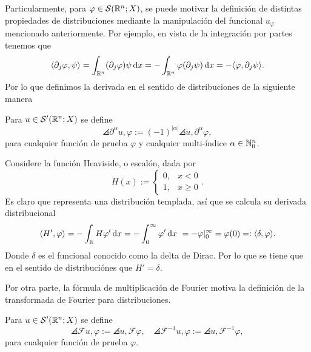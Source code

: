 Particularmente, para $\varphi\in\mathcal{S}(\mathbb{R}^n;X)$, se puede motivar la 
definición de distintas propiedades de distribuciones mediante la manipulación 
del funcional $u_\varphi$ mencionado anteriormente. Por ejemplo, en vista de
la integración por partes tenemos que 
\begin{equation*}
    \langle\partial_j\varphi, \psi\rangle = \int_{\mathbb{R}^n} (\partial_j\varphi) \psi\mathop{}\!\mathrm{d} x
    = - \int_{\mathbb{R}^n} \varphi(\partial_j \psi)\mathop{}\!\mathrm{d} x = - \langle\varphi,\partial_j
    \psi\rangle.
\end{equation*}
Por lo que definimos la derivada en el sentido de distribuciones de la 
siguiente manera
\begin{definition}
    Para $u\in\mathcal{S}'(\mathbb{R}^n;X)$ se define
    \begin{equation*}
    	\angles{\partial^\alpha u, \varphi} := (-1)^{|\alpha|} \angles{u, \partial^\alpha\varphi},
    \end{equation*}
    para cualquier función de prueba $\varphi$ y cualquier multi-índice $\alpha\in\mathbb{N}_0^n$. 
\end{definition}
\begin{example}
	Considere la función Heaviside, o escalón, dada por
	\begin{equation*}
		H(x) := \begin{cases} 0, &  x <0 \\
			1,  &x \geq 0\end{cases}.
	\end{equation*}
	Es claro que representa una distribución templada, así que se calcula su derivada distribucional
	\begin{align*}
		\langle H', \varphi\rangle = - \int_{\mathbb{R}} H\varphi'\mathop{}\!\mathrm{d} x  = -\int_0^\infty \varphi'\mathop{}\!\mathrm{d} x \ = -\varphi\vert_0^\infty  = \varphi(0) =: \langle\delta, \varphi\rangle.
	\end{align*}
	Donde $\delta$ es el funcional conocido como la delta de Dirac. Por lo que se tiene que en el sentido de distribuciónes que $ H' = \delta$.
\end{example}
Por otra parte, la fórmula de multiplicación de Fourier motiva la definición de la transformada de Fourier para distribuciones.
\begin{definition}
	Para $u\in\mathcal{S}'(\mathbb{R}^n;X)$ se define 
	\begin{equation*}
		\angles{\mathcal{F}u, \varphi} := \angles{u, \mathcal{F}\varphi}, \quad 
		\angles{\mathcal{F}^{-1}u, \varphi} := \angles{u, \mathcal{F}^{-1}\varphi},
	\end{equation*}
	para cualquier función de prueba $\varphi$.
\end{definition}
